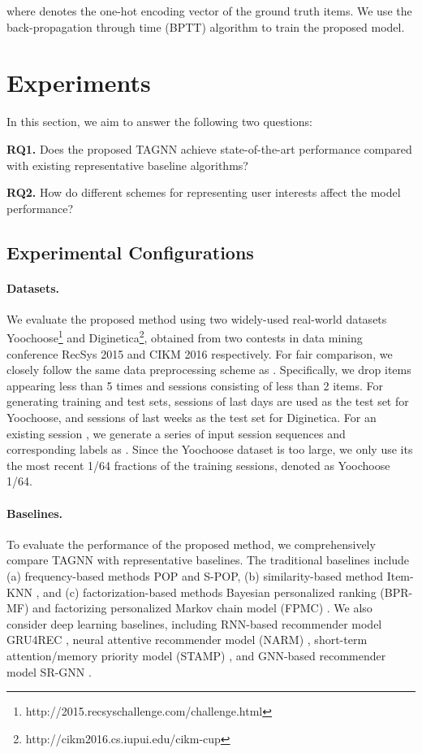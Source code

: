 \documentclass[sigconf]{acmart}
\begin{document}
where  denotes the one-hot encoding vector of the ground truth items. We use the back-propagation through time (BPTT) algorithm to train the proposed model.
 \section{Experiments}

In this section, we aim to answer the following two questions:

\textbf{RQ1.}
Does the proposed TAGNN achieve state-of-the-art performance compared with existing representative baseline algorithms?

\textbf{RQ2.}
How do different schemes for representing user interests affect the model performance?

\subsection{Experimental Configurations}

\paragraph{Datasets.}
We evaluate the proposed method using two widely-used real-world datasets Yoochoose\footnote{http://2015.recsyschallenge.com/challenge.html} and Diginetica\footnote{http://cikm2016.cs.iupui.edu/cikm-cup}, obtained from two contests in data mining conference RecSys 2015 and CIKM 2016 respectively. 
For fair comparison, we closely follow the same data preprocessing scheme as \citet{Li:2017hk,Liu:2018er,Wu:2019ke}. Specifically, we drop items appearing less than 5 times and sessions consisting of less than 2 items. For generating training and test sets, sessions of last days are used as the test set for Yoochoose, and sessions of last weeks as the test set for Diginetica. For an existing session , we generate a series of input session sequences and corresponding labels as .
Since the Yoochoose dataset is too large, we only use its the most recent 1/64 fractions of the training sessions, denoted as Yoochoose 1/64.


\paragraph{Baselines.}
To evaluate the performance of the proposed method, we comprehensively compare TAGNN with representative baselines. The traditional baselines include (a) frequency-based methods POP and S-POP,
(b) similarity-based method Item-KNN \cite{Sarwar:2001kx},
and (c) factorization-based methods Bayesian personalized ranking (BPR-MF) \cite{Rendle:2009wp}
and factorizing personalized Markov chain model (FPMC) \cite{Rendle:2010is}.
We also consider deep learning baselines, including RNN-based recommender model GRU4REC \cite{Hidasi:2016uq},
neural attentive recommender model (NARM) \cite{Li:2016vj},
short-term attention/memory priority model (STAMP) \cite{Liu:2018er},
and GNN-based recommender model SR-GNN \cite{Wu:2019ke}.
\end{document}
